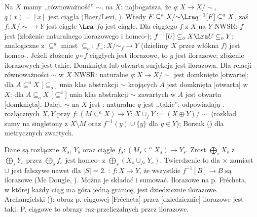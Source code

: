 Na $X$ mamy ,,równoważność'' $\sim$.
  na $X$: najbogatsza, że  $q \colon X \to X /{\sim}$, $q(x) = [x]$ jest ciągła (Baer/Levi, ).
Wtedy $F \subseteq^a X / {\sim} \Lra q^{-1}[F] \subseteq^a X$, zaś $f \colon X / {\sim} \to Y$ jest ciągłe $\Lra$ $fq$ jest ciągłe.
Dla ciągłego $f$ z $X$ na $Y$ NWSR:
$f$ jest  (złożenie naturalnego ilorazowego i homeo-);
$f^{-1}[U] \subseteq_o X \Lra U \subseteq_o Y$;
analogiczne z $\subseteq^a$ miast $\subseteq_o$;
$f_{\sim} \colon X / {\sim_f} \to Y$ (dzielimy $X$ przez włókna $f$) jest homeo-.
Jeżeli złożenie $g \circ f$ ciągłych jest ilorazowe, to $g$ jest ilorazowe; złożenie ilorazowych jest takie.
Domknięta lub otwarta surjekcja jest ilorazowa.
Dla relacji równoważności $\sim$ w $X$ NWSR: naturalne $q \colon X \to X / {\sim}$ jest domknięte [otwarte]; 
dla $A \subseteq^a X$ [$\subseteq_o$] unia klas abstrakcji $\sim$ krojących $A$ jest domknięta [otwarta] w $X$;
dla $A \subseteq_o X$ [$\subseteq^a$] unia klas abstrakcji $\sim$ zawartych w $A$ jest otwarta [domknięta].
Dalej, $\sim$ na $X$ jest : naturalne $q$ jest ,,takie''; odpowiadają .	
 rozłącznych $X, Y$ przy $f \colon (M \subseteq^a X) \to Y$: $X \cup_f Y := (X \oplus Y) / \sim$ (rozkład sumy na singletony z $X \setminus M$ oraz $f^{-1}(y) \cup \{y\}$ dla $y \in Y$); Borsuk () dla metrycznych zwartych.

Dane są rozłączne $X_s$, $Y_s$ oraz ciągłe $f_s \colon (M_s \subseteq^a X_s) \to Y_s$.
Zrost $\bigoplus_s X_s$ z $\bigoplus_s Y_s$ przez $\bigoplus_s f_s$ jest homeo- z $\bigoplus_s (X_s \cup_{fs} Y_s)$.
Twierdzenie to dla $\times$ zamiast $\cup$ jest fałszywe nawet dla $|S| = 2$.
: $f \colon X \to Y$, że wszystkie $f^{-1}[B] \to B$ są ilorazowe (Mc Dougle, ).
Można je składać i sumować.
Ilorazowe na p. Frécheta, w której każdy ciąg ma góra jedną granicę, jest dziedzicznie ilorazowe.
Archangielski (): obraz p. ciągowej [Frécheta] przez [dziedzicznie] ilorazowe jest taki.
P. ciągowe to obrazy raz-przeliczalnych przez ilorazowe.

